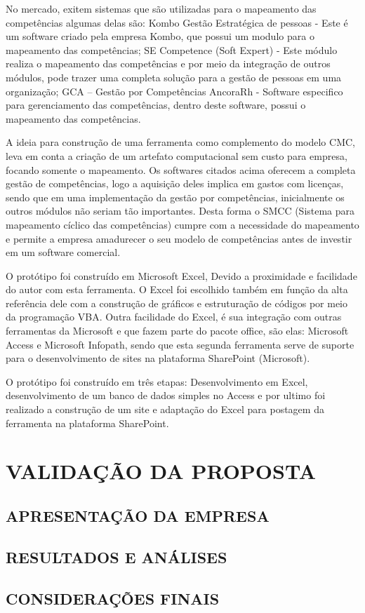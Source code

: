 No mercado, exitem sistemas que são utilizadas para o mapeamento das competências algumas delas são: Kombo Gestão Estratégica de pessoas - Este é um software criado pela empresa Kombo, que possui um modulo para o mapeamento das competências; SE Competence (Soft Expert) - Este módulo realiza o mapeamento das competências e por meio da integração de outros módulos, pode trazer uma completa solução para a gestão de pessoas em uma organização; GCA – Gestão por Competências AncoraRh - Software especifico para gerenciamento das competências, dentro deste software, possui o mapeamento das competências.

A ideia para construção de uma ferramenta como complemento do modelo CMC, leva em conta a criação de um artefato computacional sem custo para empresa, focando somente o mapeamento. Os softwares citados acima oferecem a completa gestão de competências, logo a aquisição deles implica em gastos com licenças, sendo que em uma implementação da gestão por competências, inicialmente os outros módulos não seriam tão importantes. Desta forma o SMCC (Sistema para mapeamento cíclico das competências) cumpre com a necessidade do mapeamento e permite a empresa amadurecer o seu modelo de competências antes de investir em um software comercial.

O protótipo foi construído em Microsoft Excel, Devido a proximidade e facilidade do autor com esta ferramenta. O Excel foi escolhido também em função da alta referência dele com a construção de gráficos e estruturação de códigos por meio da programação VBA. Outra facilidade do Excel, é sua integração com outras ferramentas da Microsoft e que fazem parte do pacote office, são elas: Microsoft Access e Microsoft Infopath, sendo que esta segunda ferramenta serve de suporte para o desenvolvimento de sites na plataforma SharePoint (Microsoft).

O protótipo foi construído em três etapas: Desenvolvimento em Excel, desenvolvimento de um banco de dados simples no Access e por ultimo foi realizado a construção de um site e adaptação do Excel para postagem da ferramenta na plataforma SharePoint.



\chapter{VALIDAÇÃO DA PROPOSTA}

\section{APRESENTAÇÃO DA EMPRESA}

\section{RESULTADOS E ANÁLISES}



\section{CONSIDERAÇÕES FINAIS}





